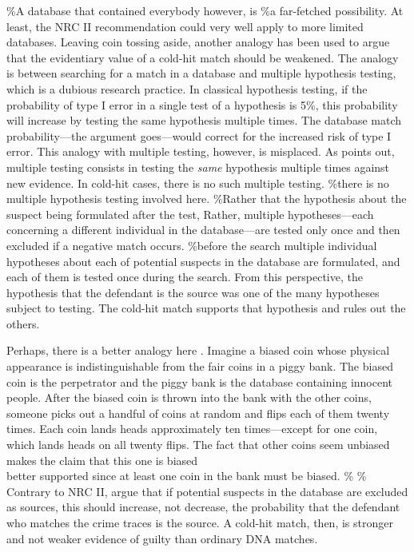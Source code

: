 \documentclass[10pt,dvipsnames,enabledeprecatedfontcommands]{scrartcl}
\begin{document}
\%A database that contained everybody however, is \%a far-fetched
possibility. At least, the NRC II recommendation could very well apply
to more limited databases. Leaving coin tossing aside, another analogy
has been used to argue that the evidentiary value of a cold-hit match
should be weakened. The analogy is between searching for a match in a
database and multiple hypothesis testing, which is a dubious research
practice. In classical hypothesis testing, if the probability of type I
error in a single test of a hypothesis is 5\%, this probability will
increase by testing the same hypothesis multiple times. The database
match probability---the argument goes---would correct for the increased
risk of type I error. This analogy with multiple testing, however, is
misplaced. As \citet{balding2002DNDatabaseSearch} points out, multiple
testing consists in testing the \textit{same} hypothesis multiple times
against new evidence. In cold-hit cases, there is no such multiple
testing. \%there is no multiple hypothesis testing involved here.
\%Rather that the hypothesis about the suspect being formulated after
the test, Rather, multiple hypotheses---each concerning a different
individual in the database---are tested only once and then excluded if a
negative match occurs. \%before the search multiple individual
hypotheses about each of potential suspects in the database are
formulated, and each of them is tested once during the search. From this
perspective, the hypothesis that the defendant is the source was one of
the many hypotheses subject to testing. The cold-hit match supports that
hypothesis and rules out the others.

Perhaps, there is a better analogy here
\citep[p.\ 950]{donnelly1999DNADatabaseSearches}. Imagine a biased coin
whose physical appearance is indistinguishable from the fair coins in a
piggy bank. The biased coin is the perpetrator and the piggy bank is the
database containing innocent people. After the biased coin is thrown
into the bank with the other coins, someone picks out a handful of coins
at random and flips each of them twenty times. Each coin lands heads
approximately ten times---except for one coin, which lands heads on all
twenty flips. The fact that other coins seem unbiased makes the claim
that this one is biased\\
better supported since at least one coin in the bank must be biased. \%
\% Contrary to NRC II, \cite{donnelly1999DNADatabaseSearches} argue that
if potential suspects in the database are excluded as sources, this
should increase, not decrease, the probability that the defendant who
matches the crime traces is the source. A cold-hit match, then, is
stronger and not weaker evidence of guilty than ordinary DNA matches.
\end{document}

